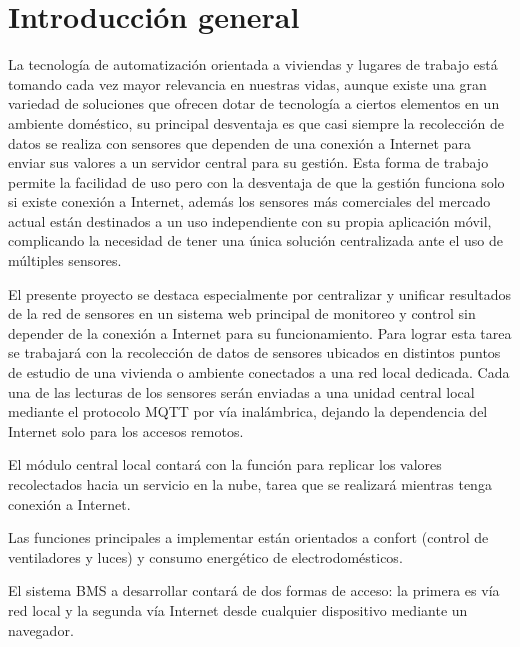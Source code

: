 
\chapter{Introducción general} %

\label{Chapter1} %
\label{IntroGeneral}
La tecnología de automatización orientada a viviendas y lugares de trabajo está tomando cada vez mayor relevancia en nuestras vidas, aunque existe una gran variedad de soluciones que ofrecen dotar de tecnología a ciertos elementos en un ambiente doméstico, su principal desventaja es que casi siempre la recolección de datos se realiza con sensores que dependen de una conexión a Internet para enviar sus valores a un servidor central para su gestión. Esta forma de trabajo permite la facilidad de uso pero con la desventaja de que la gestión funciona solo si existe conexión a Internet, además los sensores más comerciales del mercado actual están destinados a un uso independiente con su propia aplicación móvil, complicando la necesidad de tener una única solución centralizada ante el uso de múltiples sensores.

El presente proyecto se destaca especialmente por centralizar y unificar resultados de la red de sensores en un sistema web principal de monitoreo y control sin depender de la conexión a Internet para su funcionamiento. Para lograr esta tarea se trabajará con la recolección de datos de sensores ubicados en distintos puntos de estudio de una vivienda o ambiente conectados a una red local dedicada. Cada una de las lecturas de los sensores serán enviadas a una unidad central local mediante el protocolo MQTT por vía inalámbrica, dejando la dependencia del Internet solo para los accesos remotos.

El módulo central local contará con la función para replicar los valores recolectados hacia un servicio en la nube, tarea que se realizará mientras tenga conexión a Internet.

Las funciones principales a implementar están orientados a confort (control de ventiladores y luces) y consumo energético de electrodomésticos.  

El sistema BMS a desarrollar contará de dos formas de acceso: la primera es vía red local y la segunda vía Internet desde cualquier dispositivo mediante un navegador.

